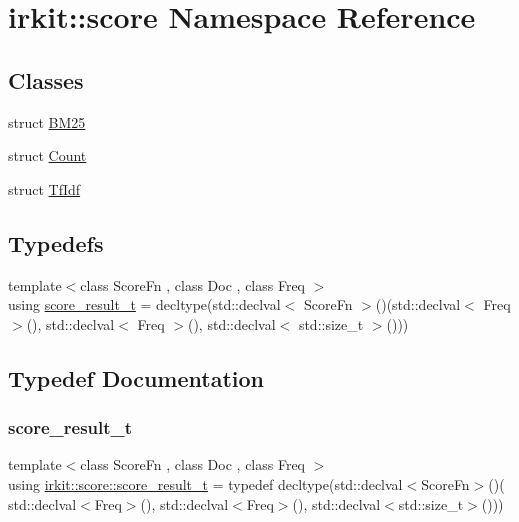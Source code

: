 \hypertarget{namespaceirkit_1_1score}{}\section{irkit\+:\+:score Namespace Reference}
\label{namespaceirkit_1_1score}
\subsection*{Classes}
\begin{DoxyCompactItemize}
\item 
struct \mbox{\hyperlink{structirkit_1_1score_1_1BM25}{B\+M25}}
\item 
struct \mbox{\hyperlink{structirkit_1_1score_1_1Count}{Count}}
\item 
struct \mbox{\hyperlink{structirkit_1_1score_1_1TfIdf}{Tf\+Idf}}
\end{DoxyCompactItemize}
\subsection*{Typedefs}
\begin{DoxyCompactItemize}
\item 
{\footnotesize template$<$class Score\+Fn , class Doc , class Freq $>$ }\\using \mbox{\hyperlink{namespaceirkit_1_1score_ab6226695d6d5c54c84fcf2cb8e90c8b3}{score\+\_\+result\+\_\+t}} = decltype(std\+::declval$<$ Score\+Fn $>$()(std\+::declval$<$ Freq $>$(), std\+::declval$<$ Freq $>$(), std\+::declval$<$ std\+::size\+\_\+t $>$()))
\end{DoxyCompactItemize}


\subsection{Typedef Documentation}
\mbox{\label{namespaceirkit_1_1score_ab6226695d6d5c54c84fcf2cb8e90c8b3}} 
\subsubsection{\texorpdfstring{score\+\_\+result\+\_\+t}{score\_result\_t}}
{\footnotesize\ttfamily template$<$class Score\+Fn , class Doc , class Freq $>$ \\
using \mbox{\hyperlink{namespaceirkit_1_1score_ab6226695d6d5c54c84fcf2cb8e90c8b3}{irkit\+::score\+::score\+\_\+result\+\_\+t}} = typedef decltype(std\+::declval$<$Score\+Fn$>$()( std\+::declval$<$Freq$>$(), std\+::declval$<$Freq$>$(), std\+::declval$<$std\+::size\+\_\+t$>$()))}

